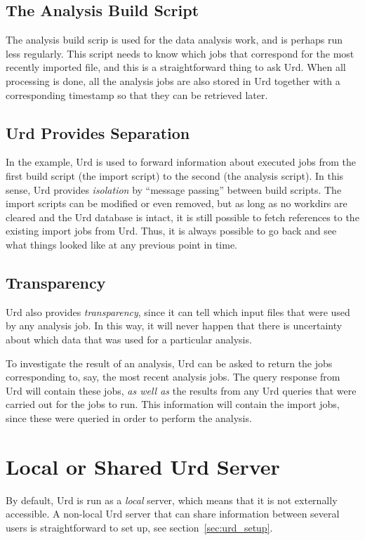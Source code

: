 \subsection{The Analysis Build Script}
The analysis build scrip is used for the data analysis work, and is
perhaps run less regularly.  This script needs to know which jobs that
correspond for the most recently imported file, and this is a
straightforward thing to ask Urd.  When all processing is done, all
the analysis jobs are also stored in Urd together with a corresponding
timestamp so that they can be retrieved later.



\subsection{Urd Provides Separation}
In the example, Urd is used to forward information about executed jobs
from the first build script (the import script) to the second (the
analysis script).  In this sense, Urd provides \textsl{isolation} by
``message passing'' between build scripts.  The import scripts can be
modified or even removed, but as long as no workdirs are cleared and
the Urd database is intact, it is still possible to fetch references
to the existing import jobs from Urd.  Thus, it is always possible to
go back and see what things looked like at any previous point in time.



\subsection{Transparency}
Urd also provides \textsl{transparency}, since it can tell which input
files that were used by any analysis job.  In this way, it will never
happen that there is uncertainty about which data that was used for a
particular analysis.

To investigate the result of an analysis, Urd can be asked to return
the jobs corresponding to, say, the most recent analysis jobs.  The
query response from Urd will contain these jobs, \textsl{as well as}
the results from any Urd queries that were carried out for the jobs to
run.  This information will contain the import jobs, since these were
queried in order to perform the analysis.





\section{Local or Shared Urd Server}
By default, Urd is run as a \textsl{local} server, which means that it
is not externally accessible.  A non-local Urd server that can share
information between several users is straightforward to set up, see
section~\ref{sec:urd_setup}.






